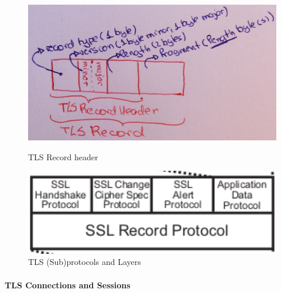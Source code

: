 \documentclass{llncs}
\begin{document}
\begin{figure}
    \centering
    \begin{minipage}{0.5\textwidth}
        \centering
        \includegraphics[width=1.0\textwidth]{img/record-header.jpg} %
        \caption{\label{fig:tls-record-header} TLS Record header}
    \end{minipage}\hfill
    \begin{minipage}{0.5\textwidth}
        \centering
        \includegraphics[width=1.0\textwidth]{img/tls-sub-protocols.png} %
        \caption{\label{fig:tls-subprotocols} TLS (Sub)protocols and Layers}
    \end{minipage}
\end{figure}

\paragraph{TLS Connections and Sessions}
\end{document}
